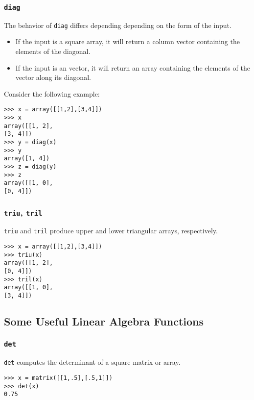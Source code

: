 \documentclass[KSmain.tex]{subfiles}
\begin{document}
\subsubsection{\texttt{diag}}
The behavior of \texttt{diag} differs depending depending on the form of the input. 
\begin{itemize}
\item If the input is a square array, it
will return a column vector containing the elements of the diagonal. 
\item If the input is an vector, it will return
an array containing the elements of the vector along its diagonal. 
\end{itemize}

Consider the following example:
\begin{framed}
\begin{verbatim}
>>> x = array([[1,2],[3,4]])
>>> x
array([[1, 2],
[3, 4]])
>>> y = diag(x)
>>> y
array([1, 4])
>>> z = diag(y)
>>> z
array([[1, 0],
[0, 4]])
\end{verbatim}
\end{framed}
\subsubsection{\texttt{triu}, \texttt{tril}}
\texttt{triu} and \texttt{tril} produce upper and lower triangular arrays, respectively.
\begin{framed}
\begin{verbatim}
>>> x = array([[1,2],[3,4]])
>>> triu(x)
array([[1, 2],
[0, 4]])
>>> tril(x)
array([[1, 0],
[3, 4]])

\end{verbatim}
\end{framed}

\newpage
\subsection{Some Useful Linear Algebra Functions}
\subsubsection*{\texttt{det}}
\texttt{det} computes the determinant of a square matrix or array.
\begin{framed}
\begin{verbatim}
>>> x = matrix([[1,.5],[.5,1]])
>>> det(x)
0.75
\end{verbatim}
\end{framed}
\end{document}
